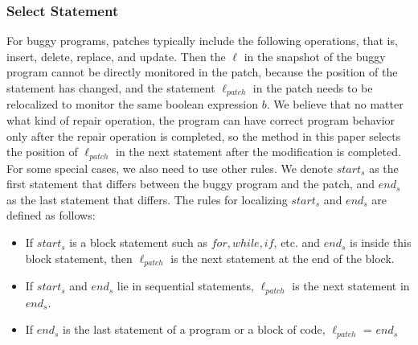 \documentclass[sn-basic]{sn-jnl}
\theoremstyle{thmstyleone}
\theoremstyle{thmstyletwo}
\theoremstyle{thmstylethree}
\begin{document}
\subsubsection{Select Statement}
For buggy programs, patches typically include the following operations, that is, insert, delete, replace, and update. Then the $\ell$ in the snapshot of the buggy program cannot be directly monitored in the patch, because the position of the statement has changed, and the statement $\ell_{patch}$ in the patch needs to be relocalized to monitor the same boolean expression $b$. We believe that no matter what kind of repair operation, the program can have correct program behavior only after the repair operation is completed, so the method in this paper selects the position of $\ell_{patch}$ in the next statement after the modification is completed. For some special cases, we also need to use other rules.
We denote $start_s$ as the first statement that differs between the buggy program and the patch, and $end_s$ as the last statement that differs. The rules for localizing $start_s$ and $end_s$ are defined as follows:
\begin{itemize}
	\item If $start_s$ is a block statement such as $for, while, if$, etc. and $end_s$ is inside this block statement, then $\ell_{patch}$ is the next statement at the end of the  block.
	\item If $start_s$ and $end_s$ lie in sequential statements, $\ell_{patch}$ is the next statement in $end_s$.
	\item If $end_s$ is the last statement of a program or a block of code, $\ell_{patch}$ = $end_s$
\end{itemize}
\end{document}
